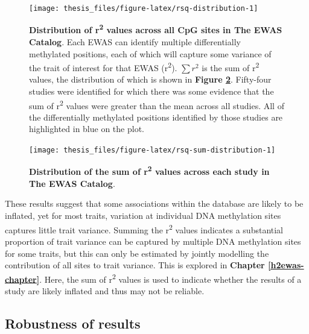 \documentclass[11pt,oneside]{bristolthesis}
\begin{document}
\begin{figure}

{\centering \texttt{[image: thesis\_files/figure-latex/rsq-distribution-1]} 

}

\caption[Distribution of r\textsuperscript{2} values across all CpG sites in The EWAS Catalog]{\textbf{Distribution of r\textsuperscript{2} values across all CpG sites in The EWAS Catalog}. Each EWAS can identify multiple differentially methylated positions, each of which will capture some variance of the trait of interest for that EWAS (r\textsuperscript{2}). \(\sum {r^2}\) is the sum of r\textsuperscript{2} values, the distribution of which is shown in \textbf{Figure \ref{fig:rsq-sum-distribution}}. Fifty-four studies were identified for which there was some evidence that the sum of r\textsuperscript{2} values were greater than the mean across all studies. All of the differentially methylated positions identified by those studies are highlighted in blue on the plot.}\label{fig:rsq-distribution}
\end{figure}



\begin{figure}

{\centering \texttt{[image: thesis\_files/figure-latex/rsq-sum-distribution-1]} 

}

\caption[Distribution of the sum of r\textsuperscript{2} values across each study in The EWAS Catalog]{\textbf{Distribution of the sum of r\textsuperscript{2} values across each study in The EWAS Catalog}.}\label{fig:rsq-sum-distribution}
\end{figure}
These results suggest that some associations within the database are likely to be inflated, yet for most traits, variation at individual DNA methylation sites captures little trait variance. Summing the r\textsuperscript{2} values indicates a substantial proportion of trait variance can be captured by multiple DNA methylation sites for some traits, but this can only be estimated by jointly modelling the contribution of all sites to trait variance. This is explored in \textbf{Chapter \ref{h2ewas-chapter}}. Here, the sum of r\textsuperscript{2} values is used to indicate whether the results of a study are likely inflated and thus may not be reliable.

\hypertarget{robustness-of-results}{%
\subsection{Robustness of results}\label{robustness-of-results}}
\end{document}
